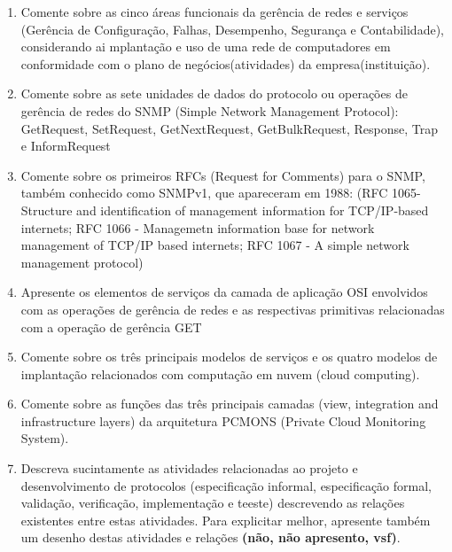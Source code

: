 \documentclass[10pt]{article}
\begin{document}
\begin{enumerate}
    \item Comente sobre as cinco áreas funcionais da gerência de redes e
    serviços (Gerência de Configuração, Falhas, Desempenho, Segurança e
    Contabilidade), considerando ai mplantação e uso de uma rede de computadores
    em conformidade com o plano de negócios(atividades) da empresa(instituição).

    \item Comente sobre as sete unidades de dados do protocolo ou operações de
    gerência de redes do SNMP (Simple Network Management Protocol): GetRequest,
    SetRequest, GetNextRequest, GetBulkRequest, Response, Trap e InformRequest

    \item Comente sobre os primeiros RFCs (Request for Comments) para o SNMP, 
    também conhecido como SNMPv1, que apareceram em 1988: (RFC 1065- Structure
    and identification of management information for TCP/IP-based internets;
    RFC 1066 - Managemetn information base for network management of TCP/IP
    based internets; RFC 1067 - A simple network management protocol)

    \item Apresente os elementos de serviços da camada de aplicação OSI envolvidos 
    com as operações de gerência de redes e as respectivas primitivas relacionadas
    com a operação de gerência GET

    \item Comente sobre os três principais modelos de serviços e os quatro modelos
    de implantação relacionados com computação em nuvem (cloud computing).

    \item Comente sobre as funções das três principais camadas (view, integration
    and infrastructure layers) da arquitetura PCMONS (Private Cloud Monitoring
    System).

    \item Descreva sucintamente as atividades relacionadas ao projeto e desenvolvimento
    de protocolos (especificação informal, especificação formal, validação, 
    verificação, implementação e teeste) descrevendo as relações existentes entre estas
    atividades. Para explicitar melhor, apresente também um desenho destas atividades e
    relações \textbf{(não, não apresento, vsf)}.


\end{enumerate}
\end{document}
